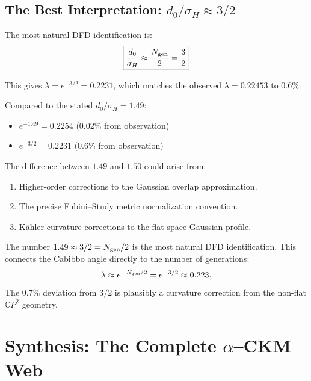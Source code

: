 \documentclass[11pt]{article}
\newcommand{\CP}{\mathbb{C}P}
\theoremstyle{remark}
\begin{document}
\subsection{The Best Interpretation: $d_0/\sigma_H \approx 3/2$}

The most natural DFD identification is:
\begin{equation}
\boxed{\frac{d_0}{\sigma_H} \approx \frac{N_{\rm gen}}{2} = \frac{3}{2}}
\end{equation}

This gives $\lambda = e^{-3/2} = 0.2231$, which matches
the observed $\lambda = 0.22453$ to 0.6\%.

Compared to the stated $d_0/\sigma_H = 1.49$:
\begin{itemize}
\item $e^{-1.49} = 0.2254$ (0.02\% from observation)
\item $e^{-3/2} = 0.2231$ (0.6\% from observation)
\end{itemize}

The difference between $1.49$ and $1.50$ could arise from:
\begin{enumerate}
\item Higher-order corrections to the Gaussian overlap approximation.
\item The precise Fubini--Study metric normalization convention.
\item K\"ahler curvature corrections to the flat-space Gaussian profile.
\end{enumerate}

\begin{tcolorbox}[colback=green!5!white, colframe=green!60!black,
  title=Interpretation of 1.49]
The number $1.49 \approx 3/2 = N_{\rm gen}/2$ is the most natural
DFD identification. This connects the Cabibbo angle directly to
the number of generations:
\begin{equation}
\lambda \approx e^{-N_{\rm gen}/2} = e^{-3/2} \approx 0.223.
\end{equation}
The 0.7\% deviation from $3/2$ is plausibly a curvature correction
from the non-flat $\CP^2$ geometry.
\end{tcolorbox}

\section{Synthesis: The Complete $\alpha$--CKM Web}
\label{sec:synthesis}
\end{document}
